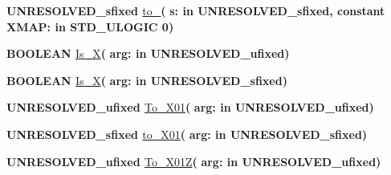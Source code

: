 \begin{DoxyCompactItemize}
\item 
{\bfseries {\bfseries \textcolor{vhdlchar}{U\+N\+R\+E\+S\+O\+L\+V\+E\+D\+\_\+sfixed}\textcolor{vhdlchar}{ }}} \hyperlink{class__fixed__pkg_a54eb204a872904b05f02e464fc87b12b}{to\+\_}{\bfseries  ( }{\bfseries \textcolor{vhdlchar}{s\+: }\textcolor{stringliteral}{in }\textcolor{vhdlchar}{U\+N\+R\+E\+S\+O\+L\+V\+E\+D\+\_\+sfixed}}{\bfseries  , {\bfseries \textcolor{keywordflow}{constant}\textcolor{vhdlchar}{ }}\textcolor{vhdlchar}{X\+M\+A\+P\+: }\textcolor{stringliteral}{in }\textcolor{vhdlchar}{S\+T\+D\+\_\+\+U\+L\+O\+G\+I\+C   \textquotesingle{}0\textquotesingle{}}}{\bfseries  )} 
\item 
{\bfseries {\bfseries \textcolor{comment}{B\+O\+O\+L\+E\+A\+N}\textcolor{vhdlchar}{ }}} \hyperlink{class__fixed__pkg_a636b800ea5efef42745688098f894ad9}{Is\+\_\+\+X}{\bfseries  ( }{\bfseries \textcolor{vhdlchar}{arg\+: }\textcolor{stringliteral}{in }\textcolor{vhdlchar}{U\+N\+R\+E\+S\+O\+L\+V\+E\+D\+\_\+ufixed}}{\bfseries  )} 
\item 
{\bfseries {\bfseries \textcolor{comment}{B\+O\+O\+L\+E\+A\+N}\textcolor{vhdlchar}{ }}} \hyperlink{class__fixed__pkg_a636b800ea5efef42745688098f894ad9}{Is\+\_\+\+X}{\bfseries  ( }{\bfseries \textcolor{vhdlchar}{arg\+: }\textcolor{stringliteral}{in }\textcolor{vhdlchar}{U\+N\+R\+E\+S\+O\+L\+V\+E\+D\+\_\+sfixed}}{\bfseries  )} 
\item 
{\bfseries {\bfseries \textcolor{vhdlchar}{U\+N\+R\+E\+S\+O\+L\+V\+E\+D\+\_\+ufixed}\textcolor{vhdlchar}{ }}} \hyperlink{class__fixed__pkg_ae292872771cd0aac2838d7b4fad747b2}{To\+\_\+\+X01}{\bfseries  ( }{\bfseries \textcolor{vhdlchar}{arg\+: }\textcolor{stringliteral}{in }\textcolor{vhdlchar}{U\+N\+R\+E\+S\+O\+L\+V\+E\+D\+\_\+ufixed}}{\bfseries  )} 
\item 
{\bfseries {\bfseries \textcolor{vhdlchar}{U\+N\+R\+E\+S\+O\+L\+V\+E\+D\+\_\+sfixed}\textcolor{vhdlchar}{ }}} \hyperlink{class__fixed__pkg_ac5b3fb81c3a159b05af4c019c17ac111}{to\+\_\+\+X01}{\bfseries  ( }{\bfseries \textcolor{vhdlchar}{arg\+: }\textcolor{stringliteral}{in }\textcolor{vhdlchar}{U\+N\+R\+E\+S\+O\+L\+V\+E\+D\+\_\+sfixed}}{\bfseries  )} 
\item 
{\bfseries {\bfseries \textcolor{vhdlchar}{U\+N\+R\+E\+S\+O\+L\+V\+E\+D\+\_\+ufixed}\textcolor{vhdlchar}{ }}} \hyperlink{class__fixed__pkg_acd138011159b452763e8186f79991503}{To\+\_\+\+X01\+Z}{\bfseries  ( }{\bfseries \textcolor{vhdlchar}{arg\+: }\textcolor{stringliteral}{in }\textcolor{vhdlchar}{U\+N\+R\+E\+S\+O\+L\+V\+E\+D\+\_\+ufixed}}{\bfseries  )} 
\item 

\end{DoxyCompactItemize}
